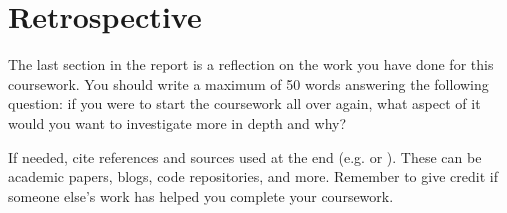 \documentclass[12pt, a4paper]{article}
\begin{document}
\section{Retrospective}
The last section in the report is a reflection on the work you have done for this coursework. You should write a maximum of 50 words answering the following question: if you were to start the coursework all over again, what aspect of it would you want to investigate more in depth and why?







\vspace{.1
in}
If needed, cite references and sources used at the end (e.g. \citep{example23} or \citet{example23}). These can be academic papers, blogs, code repositories, and more. Remember to give credit if someone else’s work has helped you complete your coursework.
\end{document}
